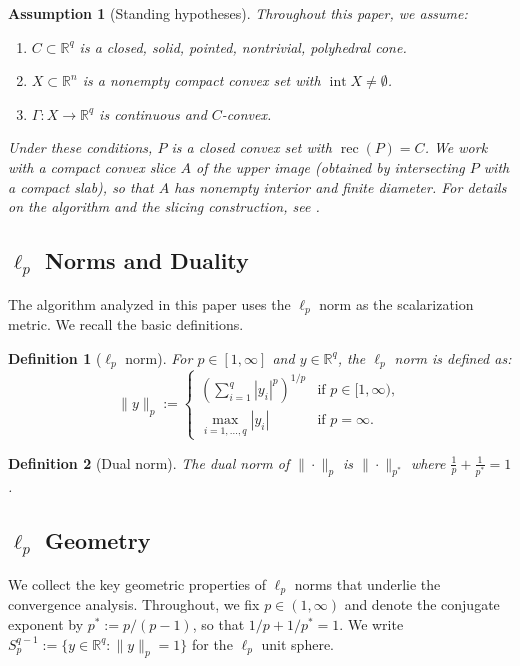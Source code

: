 \documentclass[11pt]{article}
\newtheorem{definition}{Definition}
\newtheorem{assumption}{Assumption}
\newcommand{\R}{\mathbb{R}}
\newcommand{\pstar}{p^*}
\begin{document}
\begin{assumption}[Standing hypotheses]\label{ass:standing}
Throughout this paper, we assume:
\begin{enumerate}
\item[(a)] $C\subset\R^q$ is a closed, solid, pointed, nontrivial, polyhedral cone.
\item[(b)] $X\subset\R^n$ is a nonempty compact convex set with $\operatorname{int} X\neq\emptyset$.
\item[(c)] $\Gamma:X\to\R^q$ is continuous and $C$-convex.
\end{enumerate}
Under these conditions, $P$ is a closed convex set with $\operatorname{rec}(P) = C$. We work with a compact convex \emph{slice} $A$ of the upper image (obtained by intersecting $P$ with a compact slab), so that $A$ has nonempty interior and finite diameter. For details on the algorithm and the slicing construction, see \cite{Ararat2022,Ararat2024}.
\end{assumption}

\subsection{$\ell_p$ Norms and Duality}\label{sec:lp-duality}

The algorithm analyzed in this paper uses the $\ell_p$ norm as the scalarization metric. We recall the basic definitions.

\begin{definition}[$\ell_p$ norm]
For $p \in [1, \infty]$ and $y \in \R^q$, the $\ell_p$ norm is defined as:
\[
\|y\|_p := \begin{cases}
\left( \sum_{i=1}^q |y_i|^p \right)^{1/p} & \text{if } p \in [1, \infty), \\
\max_{i=1,\ldots,q} |y_i| & \text{if } p = \infty.
\end{cases}
\]
\end{definition}

\begin{definition}[Dual norm]
The dual norm of $\|\cdot\|_p$ is $\|\cdot\|_{\pstar}$ where $\frac{1}{p} + \frac{1}{\pstar} = 1$.
\end{definition}

\subsection{$\ell_p$ Geometry}\label{sec:lp-geometry}

We collect the key geometric properties of $\ell_p$ norms that underlie the convergence analysis. Throughout, we fix $p \in (1,\infty)$ and denote the conjugate exponent by $\pstar := p/(p-1)$, so that $1/p + 1/\pstar = 1$. We write $S_p^{q-1} := \{y \in \R^q : \|y\|_p = 1\}$ for the $\ell_p$ unit sphere.
\end{document}
